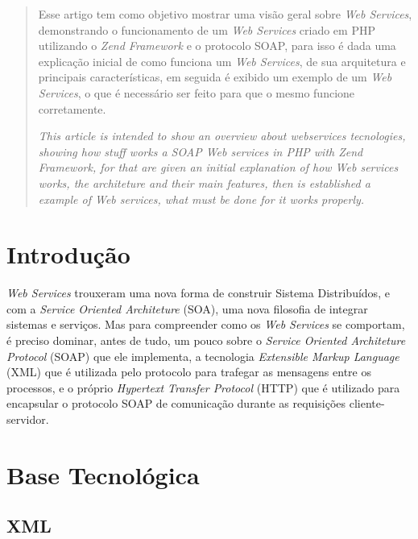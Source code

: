 \documentclass{acm_proc_article-sp}
\begin{document}
\maketitle
\begin{abstract}

		Esse artigo tem como objetivo mostrar uma visão geral sobre \emph{Web Services}, demonstrando o funcionamento de um \emph{Web Services} criado em PHP utilizando o \emph{Zend Framework} e o protocolo SOAP, para isso é dada uma explicação inicial de como funciona um \emph{Web Services}, de sua arquitetura e principais características, em seguida é exibido um exemplo de um \emph{Web Services}, o que é necessário ser feito para que o mesmo funcione corretamente.
		
		
		\emph{This article is intended to show an overview about webservices tecnologies, showing how stuff works a SOAP Web services in PHP with Zend Framework, for that are given an initial explanation of how \emph{Web} services works, the architeture and their main features, then is established a example of  \emph{Web} services, what must be done for it works properly.}
			
\end{abstract}


\section{Introdução}

		\emph{Web Services} trouxeram uma nova forma de construir Sistema Distribuídos, e com a \emph{Service Oriented Architeture} (SOA), uma nova filosofia de integrar sistemas e serviços. Mas para compreender como os \emph{Web Services} se comportam, é preciso dominar, antes de tudo, um pouco sobre o \emph{Service Oriented Architeture Protocol} (SOAP) que ele implementa, a tecnologia \emph{Extensible Markup Language} (XML) que é utilizada pelo protocolo para trafegar as mensagens entre os processos, e o próprio \emph{Hypertext Transfer Protocol} (HTTP) que é utilizado para encapsular o protocolo SOAP de comunicação durante as requisições cliente-servidor.
		
\section{Base Tecnológica}
		
	\subsection{XML}
	
\end{document}
